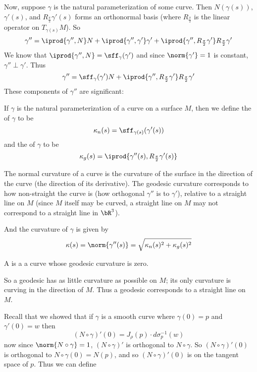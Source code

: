 Now, suppose $\gamma$ is the natural parameterization of some curve.
Then $N(\gamma(s))$, $\gamma'(s)$, and $R_{\frac\pi2}\gamma'(s)$ forms an orthonormal basis (where $R_{\frac\pi2}$ is the linear operator on $T_{\gamma(s)}M$).
So
\[ \gamma'' = \iprod{\gamma'',N}N + \iprod{\gamma'',\gamma'}\gamma' + \iprod{\gamma'',R_{\frac\pi2}\gamma'}R_{\frac\pi2}\gamma' \]
We know that $\iprod{\gamma'',N}=\sff_\gamma(\gamma')$ and since $\norm{\gamma'}=1$ is constant, $\gamma''\perp\gamma'$.
Thus
\[ \gamma'' = \sff_\gamma(\gamma')N + \iprod{\gamma'',R_{\frac\pi2}\gamma'}R_{\frac\pi2}\gamma' \]
These components of $\gamma''$ are significant:

\begin{defn*}

    If $\gamma$ is the natural parameterization of a curve on a surface $M$, then we define the  of $\gamma$ to be
    \[ \kappa_n(s) = \sff_{\gamma(s)}(\gamma'(s)) \]
    and the  of $\gamma$ to be
    \[ \kappa_g(s) = \iprod{\gamma''(s),R_{\frac\pi2}\gamma'(s)} \]

\end{defn*}

The normal curvature of a curve is the curvature of the surface in the direction of the curve (the direction of its derivative).
The geodesic curvature corresponds to how non-straight the curve is (how orthogonal $\gamma''$ is to $\gamma'$), relative to a straight line on $M$ (since $M$ itself may be curved, a straight line on $M$
may not correspond to a straight line in $\bR^3$).

And the curvature of $\gamma$ is given by
\[ \kappa(s) = \norm{\gamma''(s)} = \sqrt{\kappa_n(s)^2 + \kappa_g(s)^2} \]

\begin{defn*}

    A  is a a curve whose geodesic curvature is zero.

\end{defn*}

So a geodesic has as little curvature as possible on $M$; its only curvature is curving in the direction of $M$.
Thus a geodesic corresponds to a straight line on $M$.

Recall that we showed that if $\gamma$ is a smooth curve where $\gamma(0)=p$ and $\gamma'(0)=w$ then
\[ (N\circ\gamma)'(0) = J_\rho(p)\cdot d\sigma_p^{-1}(w) \]
now since $\norm{N\circ\gamma}=1$, $(N\circ\gamma)'$ is orthogonal to $N\circ\gamma$.
So $(N\circ\gamma)'(0)$ is orthogonal to $N\circ\gamma(0)=N(p)$, and so $(N\circ\gamma)'(0)$ is on the tangent space of $p$.
Thus we can define

